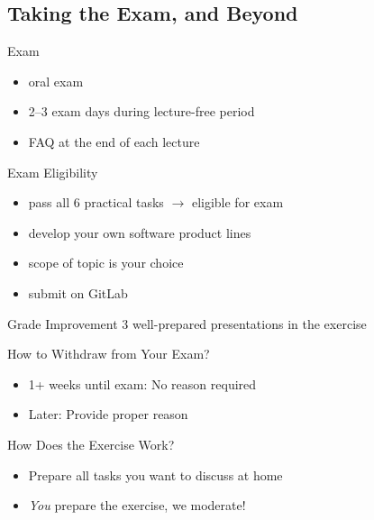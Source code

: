 

\subsection{Taking the Exam, and Beyond}

\begin{frame}[label=Exam]{\myframetitle}
	\begin{fancycolumns}
		\begin{definition}{Exam}
			\begin{itemize}
				\item oral exam %
				\item 2--3 exam days during lecture-free period
				\item FAQ at the end of each lecture
			\end{itemize}
		\end{definition}
		\begin{definition}{Exam Eligibility } %
			\begin{itemize}
				\item pass all 6 practical tasks $\rightarrow$ eligible for exam
				\item develop your own software product lines
				\item scope of topic is your choice
				\item submit on GitLab
			\end{itemize}
		\end{definition}
		\begin{definition}{Grade Improvement } %
			3 well-prepared presentations in the exercise
		\end{definition}
	\nextcolumn
		
		\begin{note}{How to Withdraw from Your Exam?}
			\begin{itemize}
				\item 1+ weeks until exam: No reason required
				\item Later: Provide proper reason
			\end{itemize}
		\end{note}	

		\begin{note}{How Does the Exercise Work?}
			\begin{itemize}
				\item Prepare all tasks you want to discuss at home
				\item \emph{You} prepare the exercise, we moderate!
			\end{itemize}
		\end{note}


\end{fancycolumns}
\end{frame}
